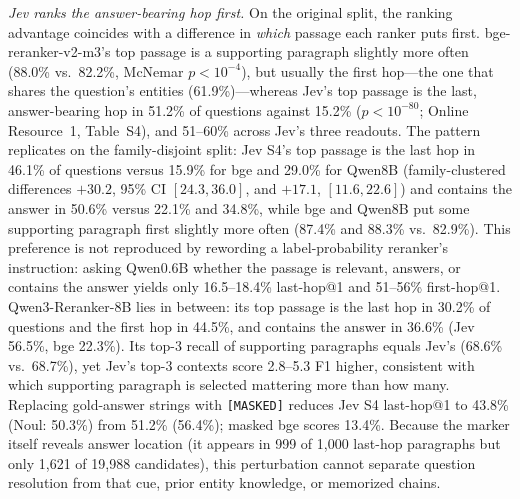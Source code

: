 \emph{Jev ranks the answer-bearing hop first.} On the original split, the ranking advantage coincides with a difference in \emph{which} passage each ranker puts first. bge-reranker-v2-m3's top passage is a supporting paragraph slightly more often (88.0\% vs.\ 82.2\%, McNemar $p<10^{-4}$), but usually the first hop---the one that shares the question's entities (61.9\%)---whereas Jev's top passage is the last, answer-bearing hop in 51.2\% of questions against 15.2\% ($p<10^{-80}$; Online Resource~1, Table~S4), and 51--60\% across Jev's three readouts. The pattern replicates on the family-disjoint split: Jev S4's top passage is the last hop in 46.1\% of questions versus 15.9\% for bge and 29.0\% for Qwen8B (family-clustered differences $+30.2$, 95\% CI $[24.3,36.0]$, and $+17.1$, $[11.6,22.6]$) and contains the answer in 50.6\% versus 22.1\% and 34.8\%, while bge and Qwen8B put some supporting paragraph first slightly more often (87.4\% and 88.3\% vs.\ 82.9\%).
This preference is not reproduced by rewording a label-probability reranker's instruction: asking Qwen0.6B whether the passage is relevant, answers, or contains the answer yields only 16.5--18.4\% last-hop@1 and 51--56\% first-hop@1. Qwen3-Reranker-8B lies in between: its top passage is the last hop in 30.2\% of questions and the first hop in 44.5\%, and contains the answer in 36.6\% (Jev 56.5\%, bge 22.3\%). Its top-3 recall of supporting paragraphs equals Jev's (68.6\% vs.\ 68.7\%), yet Jev's top-3 contexts score 2.8--5.3 F1 higher, consistent with which supporting paragraph is selected mattering more than how many.
Replacing gold-answer strings with \texttt{[MASKED]} reduces Jev S4 last-hop@1 to 43.8\% (Noul: 50.3\%) from 51.2\% (56.4\%); masked bge scores 13.4\%. Because the marker itself reveals answer location (it appears in 999 of 1{,}000 last-hop paragraphs but only 1{,}621 of 19{,}988 candidates), this perturbation cannot separate question resolution from that cue, prior entity knowledge, or memorized chains.

